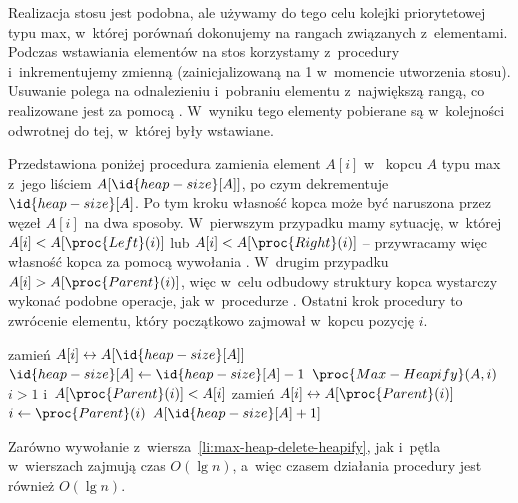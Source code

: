 Realizacja stosu jest podobna, ale używamy do tego celu kolejki priorytetowej typu max, w~której porównań dokonujemy na rangach związanych z~elementami. Podczas wstawiania elementów na stos korzystamy z~procedury  i~inkrementujemy zmienną  (zainicjalizowaną na 1 w~momencie utworzenia stosu). Usuwanie polega na odnalezieniu i~pobraniu elementu z~największą rangą, co realizowane jest za pomocą . W~wyniku tego elementy pobierane są w~kolejności odwrotnej do tej, w~której były wstawiane.

\exercise %

\noindent Przedstawiona poniżej procedura  zamienia element $A[i]$ w~ kopcu $A$ typu max z~jego liściem $A[\id{heap-size}[A]]$, po czym dekrementuje $\id{heap-size}[A]$. Po tym kroku własność kopca może być naruszona przez węzeł $A[i]$ na dwa sposoby. W~pierwszym przypadku mamy sytuację, w~której $A[i]<A[\proc{Left}(i)]$ lub $A[i]<A[\proc{Right}(i)]$ -- przywracamy więc własność kopca za pomocą wywołania . W~drugim przypadku $A[i]>A[\proc{Parent}(i)]$, więc w~celu odbudowy struktury kopca wystarczy wykonać podobne operacje, jak w~procedurze . Ostatni krok procedury to zwrócenie elementu, który początkowo zajmował w~kopcu pozycję $i$.
\begin{codebox}
\li	zamień $A[i]\leftrightarrow A[\id{heap-size}[A]]$
\li	$\id{heap-size}[A]\gets\id{heap-size}[A]-1$
\li	$\proc{Max-Heapify}(A,i)$ \label{li:max-heap-delete-heapify}
\li	\While $i>1$ i~$A[\proc{Parent}(i)]<A[i]$ \label{li:max-heap-delete-while-begin}
\li		\Do
			zamień $A[i]\leftrightarrow A[\proc{Parent}(i)]$
\li			$i\gets\proc{Parent}(i)$
		\End \label{li:max-heap-delete-while-end}
\li	\Return $A[\id{heap-size}[A]+1]$
\end{codebox}

Zarówno wywołanie z~wiersza~\ref{li:max-heap-delete-heapify}, jak i~pętla  w~wierszach \twodashes{\ref{li:max-heap-delete-while-begin}}{\ref{li:max-heap-delete-while-end}} zajmują czas $O(\lg n)$, a~więc czasem działania procedury  jest również $O(\lg n)$.

